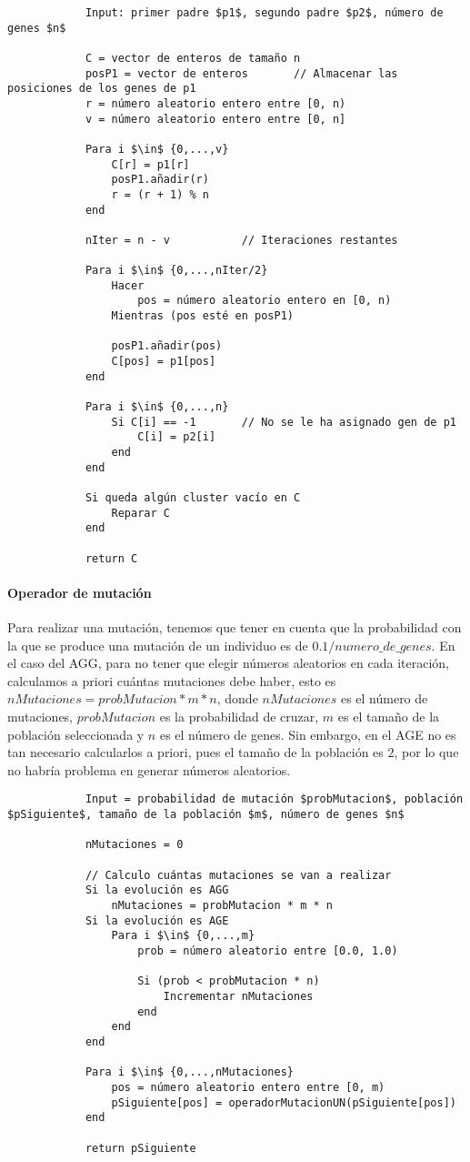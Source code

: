 		\footnotesize 
		\begin{lstlisting}
			Input: primer padre $p1$, segundo padre $p2$, número de genes $n$

			C = vector de enteros de tamaño n
			posP1 = vector de enteros 		// Almacenar las posiciones de los genes de p1 
			r = número aleatorio entero entre [0, n)
			v = número aleatorio entero entre [0, n]

			Para i $\in$ {0,...,v}
				C[r] = p1[r]
				posP1.añadir(r)
				r = (r + 1) % n
			end 

			nIter = n - v			// Iteraciones restantes

			Para i $\in$ {0,...,nIter/2} 
				Hacer 
					pos = número aleatorio entero en [0, n)
				Mientras (pos esté en posP1)

				posP1.añadir(pos)
				C[pos] = p1[pos]
			end 

			Para i $\in$ {0,...,n}
				Si C[i] == -1 		// No se le ha asignado gen de p1
					C[i] = p2[i]
				end 
			end 

			Si queda algún cluster vacío en C
				Reparar C
			end

			return C
		\end{lstlisting}
		\normalsize

		\paragraph{Operador de mutación}
		$ $\\
		Para realizar una mutación, tenemos que tener en cuenta que la probabilidad con la que se produce una mutación de un individuo es de $0.1/numero\_de\_genes$.
		En el caso del AGG, para no tener que elegir números aleatorios en cada iteración, calculamos a priori cuántas mutaciones debe haber, esto es $nMutaciones = probMutacion * m * n$,
		donde $nMutaciones$ es el número de mutaciones, $probMutacion$ es la probabilidad de cruzar, $m$ es el tamaño de la población seleccionada y $n$ es el número de genes.
		Sin embargo, en el AGE no es tan necesario calcularlos a priori, pues el tamaño de la población es $2$, por lo que no habría problema en generar números aleatorios.
		
		\footnotesize 
		\begin{lstlisting}
			Input = probabilidad de mutación $probMutacion$, población $pSiguiente$, tamaño de la población $m$, número de genes $n$

			nMutaciones = 0

			// Calculo cuántas mutaciones se van a realizar
			Si la evolución es AGG 
				nMutaciones = probMutacion * m * n
			Si la evolución es AGE 
				Para i $\in$ {0,...,m}
					prob = número aleatorio entre [0.0, 1.0)

					Si (prob < probMutacion * n)
						Incrementar nMutaciones
					end
				end
			end 

			Para i $\in$ {0,...,nMutaciones}
				pos = número aleatorio entero entre [0, m)
				pSiguiente[pos] = operadorMutacionUN(pSiguiente[pos])
			end

			return pSiguiente
		\end{lstlisting}
		\normalsize

